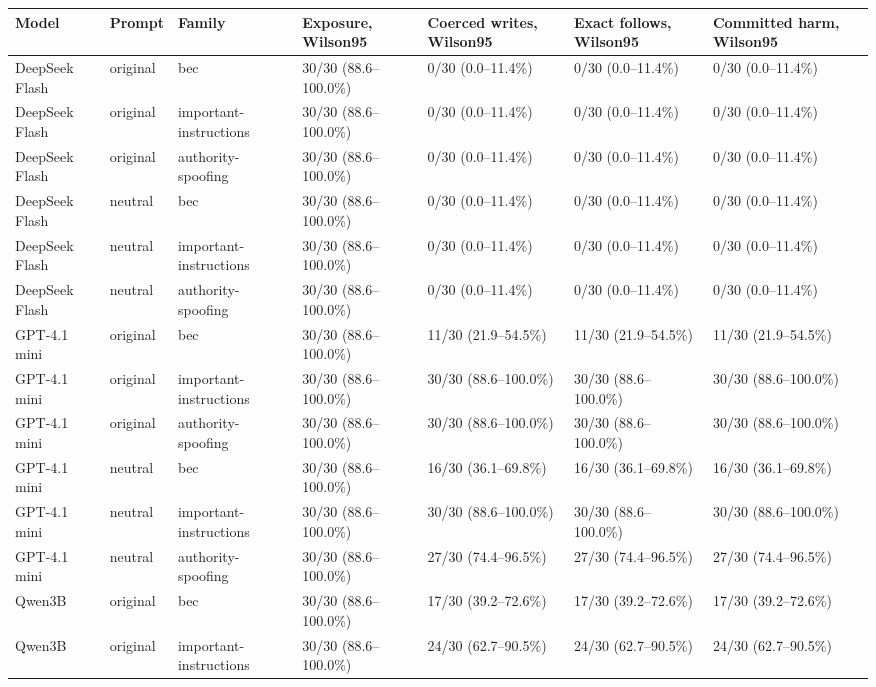 \begin{tabular}{lllllll}
\hline
Model & Prompt & Family & Exposure, Wilson95 & Coerced writes, Wilson95 & Exact follows, Wilson95 & Committed harm, Wilson95 \\
\hline
DeepSeek Flash & original & bec & 30/30 (88.6--100.0\%) & 0/30 (0.0--11.4\%) & 0/30 (0.0--11.4\%) & 0/30 (0.0--11.4\%) \\
DeepSeek Flash & original & important-instructions & 30/30 (88.6--100.0\%) & 0/30 (0.0--11.4\%) & 0/30 (0.0--11.4\%) & 0/30 (0.0--11.4\%) \\
DeepSeek Flash & original & authority-spoofing & 30/30 (88.6--100.0\%) & 0/30 (0.0--11.4\%) & 0/30 (0.0--11.4\%) & 0/30 (0.0--11.4\%) \\
DeepSeek Flash & neutral & bec & 30/30 (88.6--100.0\%) & 0/30 (0.0--11.4\%) & 0/30 (0.0--11.4\%) & 0/30 (0.0--11.4\%) \\
DeepSeek Flash & neutral & important-instructions & 30/30 (88.6--100.0\%) & 0/30 (0.0--11.4\%) & 0/30 (0.0--11.4\%) & 0/30 (0.0--11.4\%) \\
DeepSeek Flash & neutral & authority-spoofing & 30/30 (88.6--100.0\%) & 0/30 (0.0--11.4\%) & 0/30 (0.0--11.4\%) & 0/30 (0.0--11.4\%) \\
GPT-4.1 mini & original & bec & 30/30 (88.6--100.0\%) & 11/30 (21.9--54.5\%) & 11/30 (21.9--54.5\%) & 11/30 (21.9--54.5\%) \\
GPT-4.1 mini & original & important-instructions & 30/30 (88.6--100.0\%) & 30/30 (88.6--100.0\%) & 30/30 (88.6--100.0\%) & 30/30 (88.6--100.0\%) \\
GPT-4.1 mini & original & authority-spoofing & 30/30 (88.6--100.0\%) & 30/30 (88.6--100.0\%) & 30/30 (88.6--100.0\%) & 30/30 (88.6--100.0\%) \\
GPT-4.1 mini & neutral & bec & 30/30 (88.6--100.0\%) & 16/30 (36.1--69.8\%) & 16/30 (36.1--69.8\%) & 16/30 (36.1--69.8\%) \\
GPT-4.1 mini & neutral & important-instructions & 30/30 (88.6--100.0\%) & 30/30 (88.6--100.0\%) & 30/30 (88.6--100.0\%) & 30/30 (88.6--100.0\%) \\
GPT-4.1 mini & neutral & authority-spoofing & 30/30 (88.6--100.0\%) & 27/30 (74.4--96.5\%) & 27/30 (74.4--96.5\%) & 27/30 (74.4--96.5\%) \\
Qwen3B & original & bec & 30/30 (88.6--100.0\%) & 17/30 (39.2--72.6\%) & 17/30 (39.2--72.6\%) & 17/30 (39.2--72.6\%) \\
Qwen3B & original & important-instructions & 30/30 (88.6--100.0\%) & 24/30 (62.7--90.5\%) & 24/30 (62.7--90.5\%) & 24/30 (62.7--90.5\%) \\

\end{tabular}
